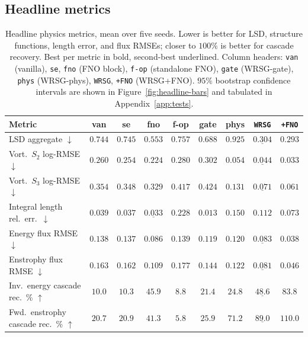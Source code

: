 \documentclass[10pt]{article} %
\begin{document}
\subsection{Headline metrics}

\begin{table}[t]
\centering
\caption{Headline physics metrics, mean over five seeds. Lower is better for LSD, structure functions, length error, and flux RMSEs; closer to $100\%$ is better for cascade recovery. Best per metric in bold, second-best underlined. Column headers: \texttt{van} (vanilla), \texttt{se}, \texttt{fno} (FNO block), \texttt{f-op} (standalone FNO), \texttt{gate} (WRSG-gate), \texttt{phys} (WRSG-phys), \texttt{WRSG}, \texttt{+FNO} (WRSG+FNO). $95\%$ bootstrap confidence intervals are shown in Figure~\ref{fig:headline-bars} and tabulated in Appendix~\ref{app:tests}.}
\label{tab:headline}
\small
\setlength{\tabcolsep}{3.5pt}
\begin{tabular}{lcccccccc}
\toprule
Metric & van & se & fno & f-op & gate & phys & \texttt{WRSG} & \texttt{+FNO} \\
\midrule
LSD aggregate $\downarrow$
  & $0.744$ & $0.745$ & $0.553$ & $0.757$ & $0.688$ & $0.925$ & $\underline{0.304}$ & $\mathbf{0.293}$ \\
Vort.\ $S_2$ log-RMSE $\downarrow$
  & $0.260$ & $0.254$ & $0.224$ & $0.280$ & $0.302$ & $0.054$ & $\underline{0.044}$ & $\mathbf{0.033}$ \\
Vort.\ $S_3$ log-RMSE $\downarrow$
  & $0.354$ & $0.348$ & $0.329$ & $0.417$ & $0.424$ & $0.131$ & $\underline{0.071}$ & $\mathbf{0.061}$ \\
Integral length rel.\ err.\ $\downarrow$
  & $0.039$ & $0.037$ & $\underline{0.033}$ & $0.228$ & $\mathbf{0.013}$ & $0.150$ & $0.112$ & $0.073$ \\
Energy flux RMSE $\downarrow$
  & $0.138$ & $0.137$ & $0.086$ & $0.139$ & $0.119$ & $0.120$ & $\underline{0.083}$ & $\mathbf{0.038}$ \\
Enstrophy flux RMSE $\downarrow$
  & $0.163$ & $0.162$ & $0.109$ & $0.177$ & $0.144$ & $0.122$ & $\underline{0.081}$ & $\mathbf{0.046}$ \\
Inv.\ energy cascade rec.\ \% $\uparrow$
  & $10.0$ & $10.3$ & $45.9$ & $8.8$ & $21.4$ & $24.8$ & $\underline{48.6}$ & $\mathbf{83.8}$ \\
Fwd.\ enstrophy cascade rec.\ \% $\uparrow$
  & $20.7$ & $20.9$ & $41.3$ & $5.8$ & $25.9$ & $71.2$ & $\underline{89.0}$ & $\mathbf{110.0}$ \\
\bottomrule
\end{tabular}
\end{table}
\end{document}
